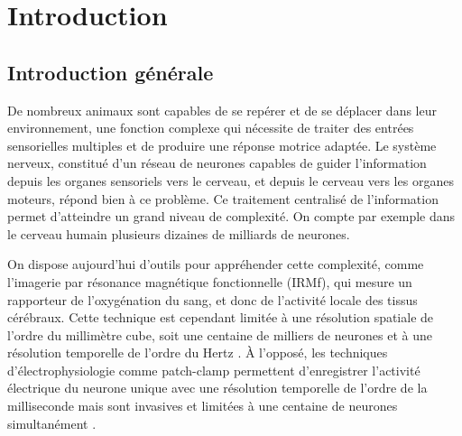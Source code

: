 \chapter{Introduction}\label{chapI}

\section{Introduction générale}

De nombreux animaux sont capables de se repérer et de se déplacer dans leur environnement, une fonction complexe qui nécessite de traiter des entrées sensorielles multiples et de produire une réponse motrice adaptée. Le système nerveux, constitué d'un réseau de neurones capables de guider l'information depuis les organes sensoriels vers le cerveau, et depuis le cerveau vers les organes moteurs, répond bien à ce problème. Ce traitement centralisé de l'information permet d'atteindre un grand niveau de complexité. On compte par exemple dans le cerveau humain plusieurs dizaines de milliards de neurones.

On dispose aujourd'hui d'outils pour appréhender cette complexité, comme l'imagerie par résonance magnétique fonctionnelle (IRMf), qui mesure un rapporteur de l'oxygénation du sang, et donc de l'activité locale des tissus cérébraux. Cette technique est cependant limitée à une résolution spatiale de l'ordre du millimètre cube, soit une centaine de milliers de neurones et à une résolution temporelle de l'ordre du Hertz \cite{goense_fmri_2016}. À l'opposé, les techniques d'électrophysiologie comme patch-clamp permettent d'enregistrer l'activité électrique du neurone unique avec une résolution temporelle de l'ordre de la milliseconde mais sont invasives et limitées à une centaine de neurones simultanément \cite{berdondini_active_2009}.

